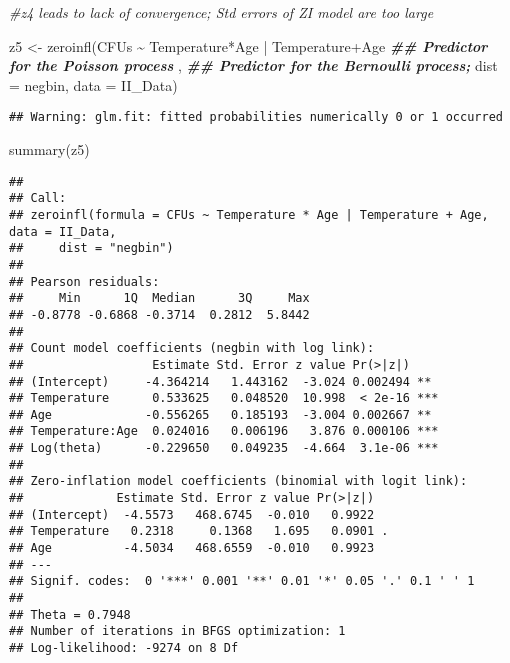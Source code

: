 \documentclass[
]{article}
\newenvironment{Shaded}{\begin{snugshade}}{\end{snugshade}}
\newcommand{\AttributeTok}[1]{\textcolor[rgb]{0.77,0.63,0.00}{#1}}
\newcommand{\CommentTok}[1]{\textcolor[rgb]{0.56,0.35,0.01}{\textit{#1}}}
\newcommand{\DocumentationTok}[1]{\textcolor[rgb]{0.56,0.35,0.01}{\textbf{\textit{#1}}}}
\newcommand{\FunctionTok}[1]{\textcolor[rgb]{0.00,0.00,0.00}{#1}}
\newcommand{\NormalTok}[1]{#1}
\newcommand{\OtherTok}[1]{\textcolor[rgb]{0.56,0.35,0.01}{#1}}
\newcommand{\SpecialCharTok}[1]{\textcolor[rgb]{0.00,0.00,0.00}{#1}}
\newcommand{\StringTok}[1]{\textcolor[rgb]{0.31,0.60,0.02}{#1}}
\begin{document}
\begin{Shaded}
\begin{Highlighting}[]
\CommentTok{\#z4 leads to lack of convergence; Std errors of ZI model are too large}

\NormalTok{z5 }\OtherTok{\textless{}{-}} \FunctionTok{zeroinfl}\NormalTok{(CFUs }\SpecialCharTok{\textasciitilde{}}\NormalTok{ Temperature}\SpecialCharTok{*}\NormalTok{Age }\SpecialCharTok{|}\NormalTok{ Temperature}\SpecialCharTok{+}\NormalTok{Age }\DocumentationTok{\#\# Predictor for the Poisson process}
\NormalTok{               , }\DocumentationTok{\#\# Predictor for the Bernoulli process;}
               \AttributeTok{dist =} \StringTok{\textquotesingle{}negbin\textquotesingle{}}\NormalTok{,}
               \AttributeTok{data =}\NormalTok{ II\_Data)}
\end{Highlighting}
\end{Shaded}

\begin{verbatim}
## Warning: glm.fit: fitted probabilities numerically 0 or 1 occurred
\end{verbatim}

\begin{Shaded}
\begin{Highlighting}[]
\FunctionTok{summary}\NormalTok{(z5)}
\end{Highlighting}
\end{Shaded}

\begin{verbatim}
## 
## Call:
## zeroinfl(formula = CFUs ~ Temperature * Age | Temperature + Age, data = II_Data, 
##     dist = "negbin")
## 
## Pearson residuals:
##     Min      1Q  Median      3Q     Max 
## -0.8778 -0.6868 -0.3714  0.2812  5.8442 
## 
## Count model coefficients (negbin with log link):
##                  Estimate Std. Error z value Pr(>|z|)    
## (Intercept)     -4.364214   1.443162  -3.024 0.002494 ** 
## Temperature      0.533625   0.048520  10.998  < 2e-16 ***
## Age             -0.556265   0.185193  -3.004 0.002667 ** 
## Temperature:Age  0.024016   0.006196   3.876 0.000106 ***
## Log(theta)      -0.229650   0.049235  -4.664  3.1e-06 ***
## 
## Zero-inflation model coefficients (binomial with logit link):
##             Estimate Std. Error z value Pr(>|z|)  
## (Intercept)  -4.5573   468.6745  -0.010   0.9922  
## Temperature   0.2318     0.1368   1.695   0.0901 .
## Age          -4.5034   468.6559  -0.010   0.9923  
## ---
## Signif. codes:  0 '***' 0.001 '**' 0.01 '*' 0.05 '.' 0.1 ' ' 1 
## 
## Theta = 0.7948 
## Number of iterations in BFGS optimization: 1 
## Log-likelihood: -9274 on 8 Df
\end{verbatim}
\end{document}
